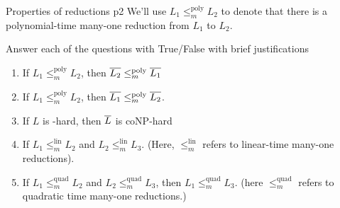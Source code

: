 \documentclass[a4paper, 11pt]{article}
\begin{document}
\begin{problem}{%
		Properties of reductions
	}{p2%
	}
We'll use $L_1\leq^{\text{poly}}_m L_2$ to denote that there is a polynomial-time many-one reduction from $L_1$ to $L_2$. 

Answer each of the questions with True/False with brief justifications
\begin{enumerate}[label=(\alph*)]
	\item If $L_1\leq^{\text{poly}}_m L_2$, then $\overline{L_2}\leq^{\text{poly}}_m \overline{L_1}$
	\item If $L_1\leq^{\text{poly}}_mL_2$, then $\overline{L_1}\leq^{\text{poly}}_m\overline{L_2}$.
	\item If $L$ is -hard, then $\overline{L}$ is \textsf{coNP}-hard
	\item If $L_1\leq^{\text{lin}}_mL_2$ and $L_2\leq^{\text{lin}}_mL_3$. (Here, $\leq^{\text{lin}}_m$ refers to linear-time many-one reductions).
	\item If $L_1\leq^{\text{quad}}_mL_2$ and $L_2\leq^{\text{quad}}_mL_3$, then $L_1\leq^{\text{quad}}_mL_3$. (here $\leq^{\text{quad}}_m$ refers to quadratic time many-one reductions.)
\end{enumerate}
\end{problem}
\end{document}
